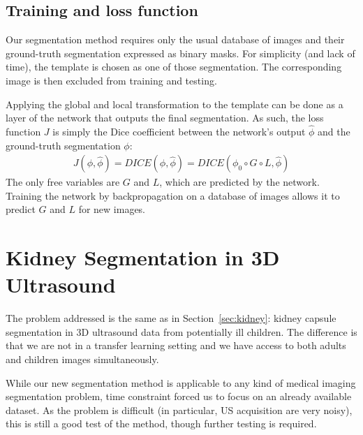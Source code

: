 \subsection{Training and loss function}
\label{ssec:seg_training}

Our segmentation method requires only the usual database of images and their ground-truth segmentation expressed as binary masks. For simplicity (and lack of time), the template is chosen as one of those segmentation. The corresponding image is then excluded from training and testing. 

Applying the global and local transformation to the template can be done as a layer of the network that outputs the final segmentation. As such, the loss function $J$ is simply the Dice coefficient between the network's output $\hat{\phi}$ and the ground-truth segmentation $\phi$:
\begin{align}
    J \left( \phi, \hat{\phi} \right) = DICE \left( \phi, \hat{\phi} \right)%
                                      = DICE \left( \phi_0 \circ G \circ L, \hat{\phi} \right)%
\end{align}
The only free variables are $G$ and $L$, which are predicted by the network. Training the network by backpropagation on a database of images allows it to predict $G$ and $L$ for new images. 

\section{Kidney Segmentation in 3D Ultrasound}
\label{sec:seg_data}

The problem addressed is the same as in Section~\ref{sec:kidney}: kidney capsule segmentation in 3D ultrasound data from potentially ill children. The difference is that we are not in a transfer learning setting and we have access to both adults and children images simultaneously.

While our new segmentation method is applicable to any kind of medical imaging segmentation problem, time constraint forced us to focus on an already available dataset. As the problem is difficult (in particular, US acquisition are very noisy), this is still a good test of the method, though further testing is required. 


